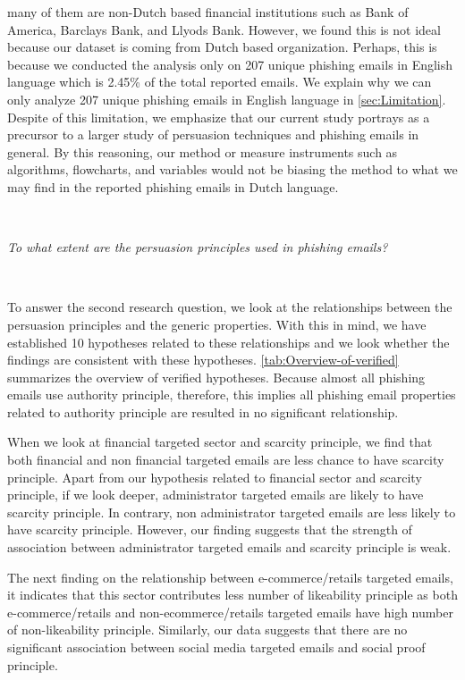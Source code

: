 many of them are non-Dutch based financial institutions such as Bank
of America, Barclays Bank, and Llyods Bank. However, we found this
is not ideal because our dataset is coming from Dutch based organization.
Perhaps, this is because we conducted the analysis only on 207 unique
phishing emails in English language which is 2.45\% of the total reported
emails. We explain why we can only analyze 207 unique phishing emails
in English language in \autoref{sec:Limitation}. Despite of this
limitation, we emphasize that our current study portrays as a precursor
to a larger study of persuasion techniques and phishing emails in
general. By this reasoning, our method or measure instruments such
as algorithms, flowcharts, and variables would not be biasing the
method to what we may find in the reported phishing emails in Dutch
language.

\ 

\textit{To what extent are the persuasion principles used in phishing
emails?}

\ 

To answer the second research question, we look at the relationships
between the persuasion principles and the generic properties. With
this in mind, we have established 10 hypotheses related to these relationships
and we look whether the findings are consistent with these hypotheses.
\autoref{tab:Overview-of-verified} summarizes the overview of verified
hypotheses. Because almost all phishing emails use authority principle,
therefore, this implies all phishing email properties related to authority
principle are resulted in no significant relationship. 

When we look at financial targeted sector and scarcity principle,
we find that both financial and non financial targeted emails are
less chance to have scarcity principle. Apart from our hypothesis
related to financial sector and scarcity principle, if we look deeper,
administrator targeted emails are likely to have scarcity principle.
In contrary, non administrator targeted emails are less likely to
have scarcity principle. However, our finding suggests that the strength
of association between administrator targeted emails and scarcity
principle is weak.

The next finding on the relationship between e-commerce/retails targeted
emails, it indicates that this sector contributes less number of likeability
principle as both e-commerce/retails and non-ecommerce/retails targeted
emails have high number of non-likeability principle. Similarly, our
data suggests that there are no significant association between social
media targeted emails and social proof principle.

